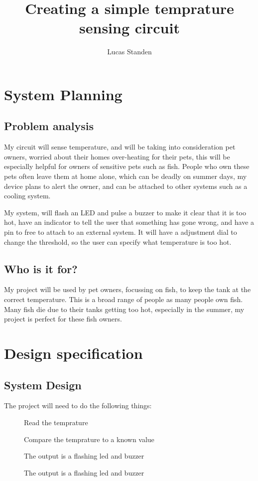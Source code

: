 \documentclass[a4paper,12pt]{article}
\author{Lucas Standen}
\title{Creating a simple temprature sensing circuit}
\begin{document}
 
\maketitle

\newpage
\tableofcontents 
\newpage

\setlength{\parskip}{1em}

{\setlength{\parindent}{0cm}
	\section{System Planning} 
	\subsection{Problem analysis} 
	My circuit will sense temperature, and will be taking into consideration pet owners, worried about their homes over-heating 
	for their pets, this will be especially helpful for owners of sensitive pets such as fish. People who own these pets often 
	leave them at home alone, which can be deadly on summer days, my device plans to alert the owner, and can be attached to other 
	systems such as a cooling system.

	My system, will flash an LED and pulse a buzzer to make it clear that it is too hot, have an indicator to tell
	the user that something has gone wrong, and have a pin to free to attach to an external system.  It will have a
	adjustment dial to change the threshold, so the user can specify what temperature is too hot.

	\subsection{Who is it for?} 
	My project will be used by pet owners, focussing on fish, to keep the tank at the
	correct temperature.  This is a broad range of people as many people own fish\cite{FISH}. Many fish die due to
	their tanks getting too hot, especially in the summer, my project is perfect for these fish owners.

	\section{Design specification} 
	\subsection{System Design} 
	The project will need to do the following things:
	\begin{description}
		\item[] Read the temprature
		\item[] Compare the temprature to a known value
		\item[] The output is a flashing led and buzzer
		\item[] The output is a flashing led and buzzer
	\end{description}

}
\end{document}

